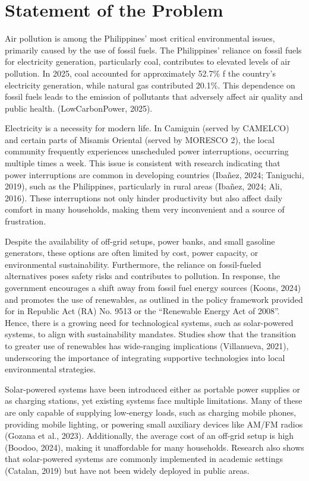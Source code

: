 {\section{Statement of the Problem}

Air pollution is among the Philippines' most critical environmental issues, primarily caused by the use of fossil fuels. The Philippines' reliance on fossil fuels for electricity generation, particularly coal, contributes to elevated levels of air pollution. In 2025, coal accounted for approximately 52.7\% f the country's electricity generation, while natural gas contributed 20.1\%. This dependence on fossil fuels leads to the emission of pollutants that adversely affect air quality and public health. (LowCarbonPower, 2025).  

Electricity is a necessity for modern life. In Camiguin (served by CAMELCO) and certain parts of Misamis Oriental (served by MORESCO 2), the local community frequently experiences unscheduled power interruptions, occurring multiple times a week. This issue is consistent with research indicating that power interruptions are common in developing countries (Ibañez, 2024; Taniguchi, 2019), such as the Philippines, particularly in rural areas (Ibañez, 2024; Ali, 2016). These interruptions not only hinder productivity but also affect daily comfort in many households, making them very inconvenient and a source of frustration.

Despite the availability of off-grid setups, power banks, and small gasoline generators, these options are often limited by cost, power capacity, or environmental sustainability.  Furthermore, the reliance on fossil-fueled alternatives poses safety risks and contributes to pollution. In response, the government encourages a shift away from fossil fuel energy sources (Koons, 2024) and promotes the use of renewables, as outlined in the policy framework provided for in Republic Act (RA) No. 9513 or the “Renewable Energy Act of 2008”. Hence, there is a growing need for technological systems, such as solar-powered systems, to align with sustainability mandates. Studies show that the transition to greater use of renewables has wide-ranging implications (Villanueva, 2021), underscoring the importance of integrating supportive technologies into local environmental strategies.

Solar-powered systems have been introduced either as portable power supplies or as charging stations, yet existing systems face multiple limitations. Many of these are only capable of supplying low-energy loads, such as charging mobile phones, providing mobile lighting, or powering small auxiliary devices like AM/FM radios (Gozana et al., 2023). Additionally, the average cost of an off-grid setup is high (Boodoo, 2024), making it unaffordable for many households. Research also shows that solar-powered systems are commonly implemented in academic settings (Catalan, 2019) but have not been widely deployed in public areas.

}
